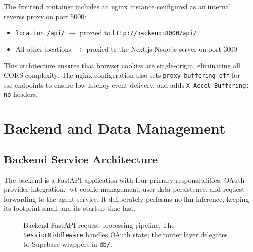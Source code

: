 \documentclass[12pt,a4paper,oneside]{book}
\begin{document}
The frontend container includes an nginx instance configured as an internal reverse proxy on port 5000:

\begin{itemize}
  \item \texttt{location /api/} $\rightarrow$ proxied to \texttt{http://backend:8000/api/}
  \item All other locations $\rightarrow$ proxied to the Next.js Node.js server on port 3000
\end{itemize}

This architecture ensures that browser cookies are single-origin, eliminating all CORS complexity. The nginx configuration also sets \texttt{proxy\_buffering off} for \gls{sse} endpoints to ensure low-latency event delivery, and adds \texttt{X-Accel-Buffering: no} headers.

\chapter{Backend and Data Management}
\label{chap:backend}

\section{Backend Service Architecture}

The backend is a FastAPI application with four primary responsibilities: OAuth provider integration, \gls{jwt} cookie management, user data persistence, and request forwarding to the agent service. It deliberately performs no \gls{llm} inference, keeping its footprint small and its startup time fast.

\begin{figure}[H]
\centering
{}
\caption{Backend FastAPI request processing pipeline. The \texttt{SessionMiddleware} handles OAuth state; the router layer delegates to Supabase wrappers in \texttt{db/}.}
\label{fig:backend_arch}
\end{figure}
\end{document}

